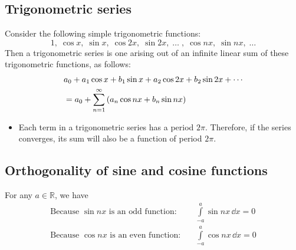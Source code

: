     \subsection{Trigonometric series}
        Consider the following simple trigonometric functions:
        $$1,\;\cos{x},\;\sin{x},\;\cos{2x},\;\sin{2x},\;\dots\;,\;\cos{nx},\;\sin{nx},\;\dots$$
        Then a trigonometric series is one arising out of an infinite linear sum of these trigonometric functions, as follows:
        \begin{align*}
            &a_0+a_1\cos{x}+b_1\sin{x}+a_2\cos{2x}+b_2\sin{2x}+\cdots \\
            &=a_0+\sum_{n=1}^{\infty}{\qty(a_n\cos{nx}+b_n\sin{nx})}
        \end{align*}
        \begin{itemize}
            \item Each term in a trigonometric series has a period $2\pi$. Therefore, if the series converges, its sum will also be a function of period $2\pi$.
        \end{itemize}

    \setcounter{equation}{0}
    \subsection{Orthogonality of sine and cosine functions}
        For any $a\in\mathbb{R}$, we have
        \begin{align}
            \text{Because $\sin{nx}$ is an odd function:}\quad&\int\limits_{-a}^{a}{\sin{nx}\,\dd{x}}=0 \label{eqn:integ-sin}\\
            \text{Because $\cos{nx}$ is an even function:}\quad&\int\limits_{-a}^{a}{\cos{nx}\,\dd{x}}=0 \label{eqn:integ-cos}
        \end{align}

